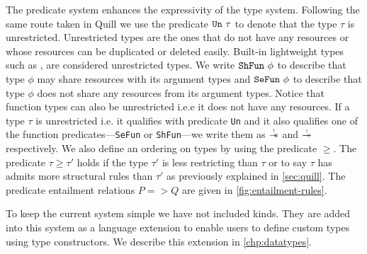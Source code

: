 The predicate system enhances the expressivity of the type system. Following the same route taken
in Quill \citep{morris_best_2016} we use the predicate $\texttt{Un}\ \tau$ to denote
that the type $\tau$ is unrestricted. Unrestricted types are the ones that do not have any resources or whose resources can
be duplicated or deleted easily. Built-in lightweight types such as ,  are considered unrestricted types.
We write $\texttt{ShFun}\ \phi$ to describe that type $\phi$ may share resources with its
argument types and  $\texttt{SeFun}\ \phi$ to describe that type $\phi$ does not share any resources from its argument types.
Notice that function types can also be unrestricted i.e.e it does not have any resources. If a type $\tau$ is unrestricted i.e. it qualifies with predicate
\texttt{Un} and it also qualifies one of the function predicates---\texttt{SeFun} or \texttt{ShFun}---we write
them as $\tightoverset{\scalebox{0.5}{!}}{\sepimp}$ and $\tightoverset{\scalebox{0.5}{!}}{\shimp}$ respectively.
We also define an ordering on types by using the predicate $\geq$. The predicate $\tau \geq \tau'$ holds if the type $\tau'$
is less restricting than $\tau$ or to say $\tau$ has admits more structural rules than $\tau'$ as previously explained in \cref{sec:quill}.
The predicate entailment relations $P => Q$ are given in \cref{fig:entailment-rules}.

To keep the current system simple we have not included kinds. They are added into this system as a language extension
to enable users to define custom types using type constructors. We describe this extension in \cref{chp:datatypes}.

